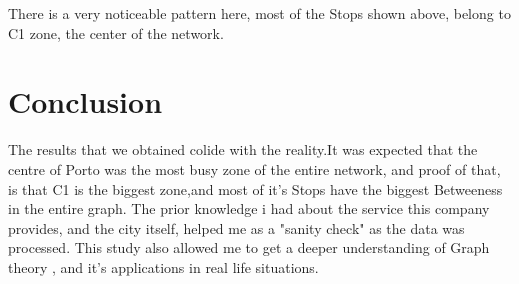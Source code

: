 \documentclass[12pt]{article}
\begin{document}
\begin{multicols}{2}
There is a very noticeable pattern here, most of the Stops shown above, belong to C1 zone, the center of the network.

\section{Conclusion}
	The results that we obtained colide with the reality.It was expected that the centre of Porto was the most busy zone of the entire network, and proof of that, is that C1 is the biggest zone,and most of it's Stops have the biggest Betweeness in the entire graph. The prior knowledge i had about the service this company provides, and the city itself, helped me as a "sanity check" as the data was processed. This study also allowed me to get a deeper understanding of Graph theory , and it's applications in real life situations.

	

\end{multicols}	
\end{document}
